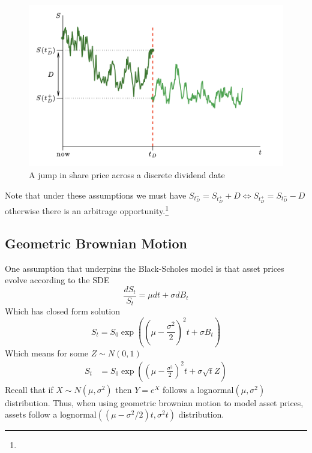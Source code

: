 \documentclass{article}
\begin{document}
\begin{figure}[h]
\centering
\includegraphics[scale=0.6]{images/DividendDate.png}
\caption{A jump in share price across a discrete dividend date}
\end{figure}
Note that under these assumptions we must have 
$S_{t_D^-} = S_{t_D^+} + D  \iff  S_{t_D^+} =  S_{t_D^-} - D $ otherwise there is an arbitrage opportunity.\footnote{}

\subsection{Geometric Brownian Motion}
One assumption that underpins the Black-Scholes model is that asset prices evolve according to the SDE 
$$\frac{dS_t}{S_t} = \mu dt + \sigma dB_t$$
Which has closed form solution 
$$S_t = S_0 \exp\left(\left(\mu-\frac{\sigma^2}{2}\right)^2t + \sigma B_t\right)$$
Which means for some $Z\sim N(0,1)$
\begin{align*}
    S_t &= S_0
\exp\left(\left(\mu-\frac{\sigma^2}{2}\right)^2t + \sigma \sqrt{t}Z\right)
\end{align*}
Recall that if $X\sim N(\mu,\sigma^2)$ then $Y=e^X$ follows a lognormal$(\mu, \sigma^2)$ distribution. Thus, when using geometric brownian motion to model asset prices, assets follow a lognormal$((\mu-\sigma^2/2)t, \sigma^2t)$ distribution.



\newpage
\end{document}
